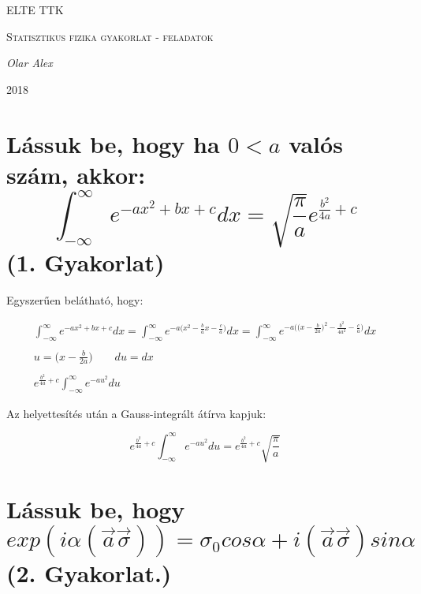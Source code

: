 \documentclass[a4paper,12pt]{article}
\begin{document}
\linespread{1.2}

\begin{titlepage}

	{\scshape\LARGE ELTE TTK \par}
	\vspace{3cm}
	{\scshape\Large Statisztikus fizika gyakorlat -  \large feladatok \par}
	\vspace{1cm}
	{\large\itshape Olar Alex\par}
	\vfill
	{\large 2018 \par}
	
\end{titlepage}

\section{Lássuk be, hogy ha $0 < a$ valós szám, akkor: \[\int_{-\infty}^{\infty}e^{-ax^{2} + bx + c}dx = \sqrt{\frac{\pi}{a}}e^{\frac{b^{2}}{4a} + c}\] (1. Gyakorlat)}

\par Egyszerűen belátható, hogy:

\begin{equation*}
\begin{gathered}
\int_{-\infty}^{\infty}e^{-ax^{2} + bx + c}dx = \int_{-\infty}^{\infty}e^{-a\big(x^{2} - \frac{b}{a}x - \frac{c}{a}\big)}dx = \int_{-\infty}^{\infty}e^{-a\big(\big(x - \frac{b}{2a}\big)^{2} - \frac{b^{2}}{4a^{2}} - \frac{c}{a}\big)}dx \\ \\
u = \big(x - \frac{b}{2a}\big) \quad \quad du = dx \\ \\
e^{\frac{b^{2}}{4a} + c}\int_{-\infty}^{\infty}e^{-au^{2}}du
\end{gathered}
\end{equation*}

\par Az helyettesítés után a Gauss-integrált átírva kapjuk:

\begin{equation}
e^{\frac{b^{2}}{4a} + c}\int_{-\infty}^{\infty}e^{-au^{2}}du = e^{\frac{b^{2}}{4a} + c}\sqrt{\frac{\pi}{a}}
\end{equation}

\section{Lássuk be, hogy \[exp(i\alpha(\vec{a}\vec{\sigma})) = \sigma_{0}cos\alpha + i(\vec{a}\vec{\sigma})sin\alpha\] (2. Gyakorlat.)}
\end{document}

